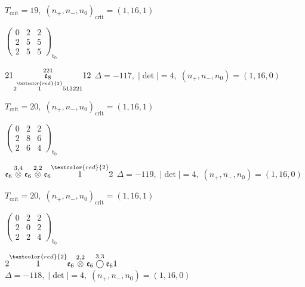 \documentclass[10pt]{article}
\begin{document}
\hspace{1em}$T_{\text{crit}}=19,\; (n_+,n_-,n_0)_{\text{crit}}=(1,16,1)$

\hspace{2em}$\left(\begin{smallmatrix}0 & 2 & 2 \\ 2 & 5 & 5 \\ 2 & 5 & 5\end{smallmatrix}\right)_{\!b_0}$

\smallskip

$21\overset{221}{\underset{2\overset{\textcolor{red}{2}}{1}513221}{\mathfrak{e}_8}}12$ \quad $\Delta=-117,\; |\det|=4,\; (n_+,n_-,n_0)=(1,16,0)$

\hspace{1em}$T_{\text{crit}}=20,\; (n_+,n_-,n_0)_{\text{crit}}=(1,16,1)$

\hspace{2em}$\left(\begin{smallmatrix}0 & 2 & 2 \\ 2 & 8 & 6 \\ 2 & 6 & 4\end{smallmatrix}\right)_{\!b_0}$

\smallskip

$\mathfrak{e}_6\overset{3,4}{\otimes}\mathfrak{e}_6\overset{2,2}{\otimes}\mathfrak{e}_6\overset{\textcolor{red}{2}}{1}2$ \quad $\Delta=-119,\; |\det|=4,\; (n_+,n_-,n_0)=(1,16,0)$

\hspace{1em}$T_{\text{crit}}=20,\; (n_+,n_-,n_0)_{\text{crit}}=(1,16,1)$

\hspace{2em}$\left(\begin{smallmatrix}0 & 2 & 2 \\ 2 & 0 & 2 \\ 2 & 2 & 4\end{smallmatrix}\right)_{\!b_0}$

\smallskip

$2\overset{\textcolor{red}{2}}{1}\mathfrak{e}_6\overset{2,2}{\otimes}\mathfrak{e}_6\overset{3,3}{\bigcirc}\mathfrak{e}_61$ \quad $\Delta=-118,\; |\det|=4,\; (n_+,n_-,n_0)=(1,16,0)$
\end{document}
